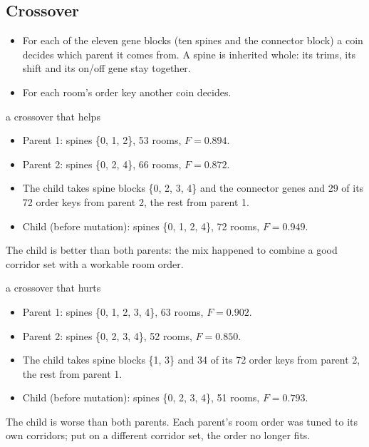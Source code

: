 \documentclass[10pt,a4paper]{article}
\begin{document}
\subsection{Crossover}
\begin{itemize}
\item For each of the eleven gene blocks (ten spines and the connector block) a coin decides which parent it comes
from. A spine is inherited whole: its trims, its shift and its on/off gene stay together.
\item For each room's order key another coin decides.
\end{itemize}
\begin{example}{a crossover that helps}
\begin{itemize}
\item Parent 1: spines \{0, 1, 2\}, 53 rooms, $F = 0.894$.
\item Parent 2: spines \{0, 2, 4\}, 66 rooms, $F = 0.872$.
\item The child takes spine blocks \{0, 2, 3, 4\} and the connector genes and 29 of its 72 order keys from parent 2, the rest from parent 1.
\item Child (before mutation): spines \{0, 1, 2, 4\}, 72 rooms, $F = 0.949$.
\end{itemize}
The child is better than both parents: the mix happened to combine a good corridor set with a workable room order.
\end{example}
\begin{example}{a crossover that hurts}
\begin{itemize}
\item Parent 1: spines \{0, 1, 2, 3, 4\}, 63 rooms, $F = 0.902$.
\item Parent 2: spines \{0, 2, 3, 4\}, 52 rooms, $F = 0.850$.
\item The child takes spine blocks \{1, 3\} and 34 of its 72 order keys from parent 2, the rest from parent 1.
\item Child (before mutation): spines \{0, 2, 3, 4\}, 51 rooms, $F = 0.793$.
\end{itemize}
The child is worse than both parents. Each parent's room order was tuned to its own corridors; put on a different corridor set, the order no longer fits.
\end{example}
\end{document}
